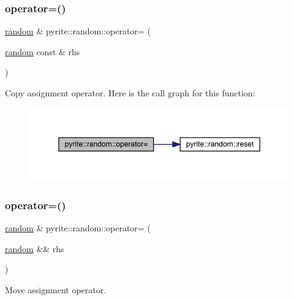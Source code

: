 \subsubsection{\texorpdfstring{operator=()}{operator=()}\hspace{0.1cm}{\footnotesize\ttfamily [1/2]}}
{\footnotesize\ttfamily \mbox{\hyperlink{classpyrite_1_1random}{random}} \& pyrite\+::random\+::operator= (\begin{DoxyParamCaption}\item[{\mbox{\hyperlink{classpyrite_1_1random}{random}} const \&}]{rhs }\end{DoxyParamCaption})}

Copy assignment operator. Here is the call graph for this function\+:
\nopagebreak
\begin{figure}[H]
\begin{center}
\leavevmode
\includegraphics[width=350pt]{d2/df9/classpyrite_1_1random_a3cd7cfec2938a1bd9541f34bf2b7ac77_cgraph}
\end{center}
\end{figure}
\mbox{\label{classpyrite_1_1random_a611890eeb411e9081e218d68bb507810}} 
\subsubsection{\texorpdfstring{operator=()}{operator=()}\hspace{0.1cm}{\footnotesize\ttfamily [2/2]}}
{\footnotesize\ttfamily \mbox{\hyperlink{classpyrite_1_1random}{random}} \& pyrite\+::random\+::operator= (\begin{DoxyParamCaption}\item[{\mbox{\hyperlink{classpyrite_1_1random}{random}} \&\&}]{rhs }\end{DoxyParamCaption})}

Move assignment operator. \mbox{\label{classpyrite_1_1random_a6c58ae19800d0e1f8388b6afbb79a1ba}} 
